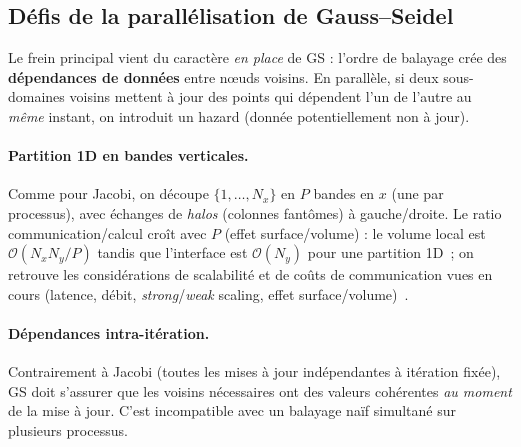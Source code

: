 \documentclass{article}
\begin{document}
\subsection{Défis de la parallélisation de Gauss--Seidel}
Le frein principal vient du caractère \emph{en place} de GS : l’ordre de balayage crée des \textbf{dépendances de données} entre n{\oe}uds voisins. En parallèle, si deux sous-domaines voisins mettent à jour des points qui dépendent l’un de l’autre au \emph{même} instant, on introduit un hazard (donnée potentiellement non à jour).

\paragraph{Partition 1D en bandes verticales.} Comme pour Jacobi, on découpe $\{1,\dots,N_x\}$ en $P$ bandes en $x$ (une par processus), avec échanges de \emph{halos} (colonnes fantômes) à gauche/droite. Le ratio communication/calcul croît avec $P$ (effet surface/volume) : le volume local est $\mathcal{O}(N_xN_y/P)$ tandis que l’interface est $\mathcal{O}(N_y)$ pour une partition 1D~; on retrouve les considérations de scalabilité et de coûts de communication vues en cours (latence, débit, \emph{strong}/\emph{weak} scaling, effet surface/volume)~\cite{slides4}. 

\paragraph{Dépendances intra-itération.} Contrairement à Jacobi (toutes les mises à jour indépendantes à itération fixée), GS doit s’assurer que les voisins nécessaires ont des valeurs cohérentes \emph{au moment} de la mise à jour. C’est incompatible avec un balayage naïf simultané sur plusieurs processus.
\end{document}

